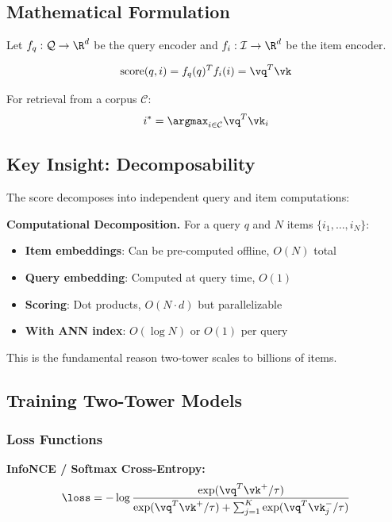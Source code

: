 \subsection{Mathematical Formulation}

Let $f_q: \mathcal{Q} \to \R^d$ be the query encoder and $f_i: \mathcal{I} \to \R^d$ be the item encoder.

\begin{equation}
\text{score}(q, i) = f_q(q)^T f_i(i) = \vq^T \vk
\end{equation}

For retrieval from a corpus $\mathcal{C}$:
\begin{equation}
i^* = \argmax_{i \in \mathcal{C}} \vq^T \vk_i
\end{equation}

\subsection{Key Insight: Decomposability}

The score decomposes into independent query and item computations:

\textbf{Computational Decomposition.} For a query $q$ and $N$ items $\{i_1, \ldots, i_N\}$:
\begin{itemize}
    \item \textbf{Item embeddings}: Can be pre-computed offline, $O(N)$ total
    \item \textbf{Query embedding}: Computed at query time, $O(1)$
    \item \textbf{Scoring}: Dot products, $O(N \cdot d)$ but parallelizable
    \item \textbf{With ANN index}: $O(\log N)$ or $O(1)$ per query
\end{itemize}

This is the fundamental reason two-tower scales to billions of items.

\subsection{Training Two-Tower Models}

\subsubsection{Loss Functions}

\textbf{InfoNCE / Softmax Cross-Entropy:}
\begin{equation}
\loss = -\log \frac{\exp(\vq^T \vk^+ / \tau)}{\exp(\vq^T \vk^+ / \tau) + \sum_{j=1}^{K} \exp(\vq^T \vk_j^- / \tau)}
\end{equation}

